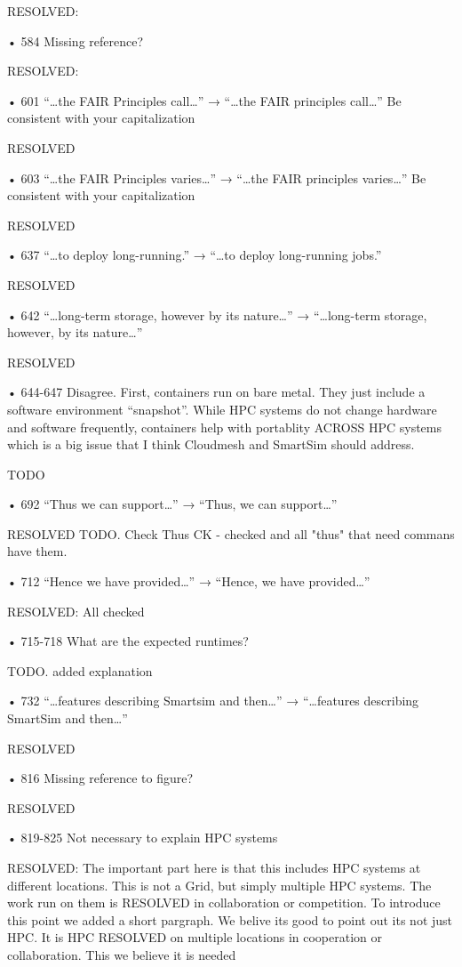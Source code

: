     RESOLVED:
    
• 584 Missing reference?

    RESOLVED:
    
• 601 “…the FAIR Principles call…” → “…the FAIR principles call…” Be consistent with
your capitalization

    RESOLVED

• 603 “…the FAIR Principles varies…” → “…the FAIR principles varies…” Be consistent
with your capitalization

    RESOLVED
    
• 637 “…to deploy long-running.” → “…to deploy long-running jobs.”

    RESOLVED
    
• 642 “…long-term storage, however by its nature…” → “…long-term storage, however,
by its nature…”

    RESOLVED

• 644-647 Disagree. First, containers run on bare metal. They just include a software
environment “snapshot”. While HPC systems do not change hardware and software
frequently, containers help with portablity ACROSS HPC systems which is a big issue
that I think Cloudmesh and SmartSim should address.

    TODO

• 692 “Thus we can support…” → “Thus, we can support…”

    RESOLVED
    TODO. Check Thus
    CK - checked and all "thus" that need commans have them.

• 712 “Hence we have provided…” → “Hence, we have provided…”

    RESOLVED: All checked
    
• 715-718 What are the expected runtimes?

    TODO. added explanation
    
• 732 “…features describing Smartsim and then…” → “…features describing SmartSim
and then…”

    RESOLVED 
    
• 816 Missing reference to figure?

    RESOLVED
    
• 819-825 Not necessary to explain HPC systems

    RESOLVED: The important part here is that this includes HPC systems at different locations. This is not a Grid, but simply multiple HPC systems. The work run on them is RESOLVED in collaboration or competition. To introduce this point we added a short pargraph. We belive its good to point out its not just HPC. It is HPC RESOLVED on multiple locations in cooperation or collaboration. This we believe it is needed
    
